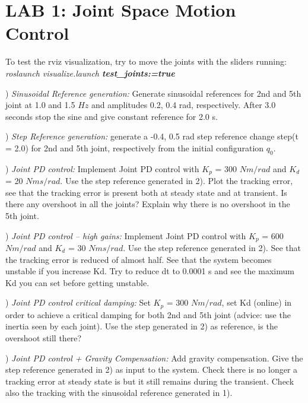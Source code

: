 \documentclass{report}
\begin{document}
\section*{LAB 1: Joint Space Motion Control }

To test the rviz visualization, try to move the joints with the sliders running:\\
\textit{roslaunch visualize.launch \textbf{test\_joints:=true} }

\quad

) \textit{Sinusoidal Reference generation:}
 Generate sinusoidal references for 2nd and 5th joint at  1.0 and 1.5 $Hz$ and amplitudes 0.2, 0.4 rad, respectively. After 3.0 seconds stop the sine and give constant reference for 2.0 s.

\quad

) \textit{Step Reference generation:} generate a -0.4, 0.5 rad step reference change step(t = 2.0) for 2nd and 5th joint, respectively from the initial configuration $q_0$.  

\quad

)\textit{ Joint PD control:}
Implement Joint PD control with $K_p$ = 300 $Nm/rad$ and $K_d$ = 20 $Nms/rad$. Use the step reference generated in 2). Plot the tracking error, see that the tracking error is present both at steady state and at transient. Is there any overshoot in all the joints? Explain why there is no overshoot in the 5th joint.

\quad

)\textit{ Joint PD control – high gains:}
Implement Joint PD control with $K_p$ = 600 $Nm/rad$ and $K_d$ = 30 $Nms/rad$.  Use the step reference generated in 2). See that the tracking error is reduced of almost half. See that the system becomes unstable if you increase Kd. Try to reduce dt to 0.0001 s and see the maximum Kd you can set before getting unstable.

\quad

)\textit{ Joint PD control critical damping:}
Set $K_p$ = 300 $Nm/rad$, set Kd (online) in order to achieve a critical damping for both  2nd and 5th joint (advice: use the inertia seen by each joint). Use the step generated in 2) as reference, is the overshoot still there?

\quad

) \textit{ Joint PD control + Gravity Compensation:}
Add gravity compensation. Give the step reference generated in 2) as input to the system. Check there is no longer a  tracking error at steady state is  but it still remains during the transient.
Check also the tracking with  the sinusoidal reference generated in 1).
\end{document}
